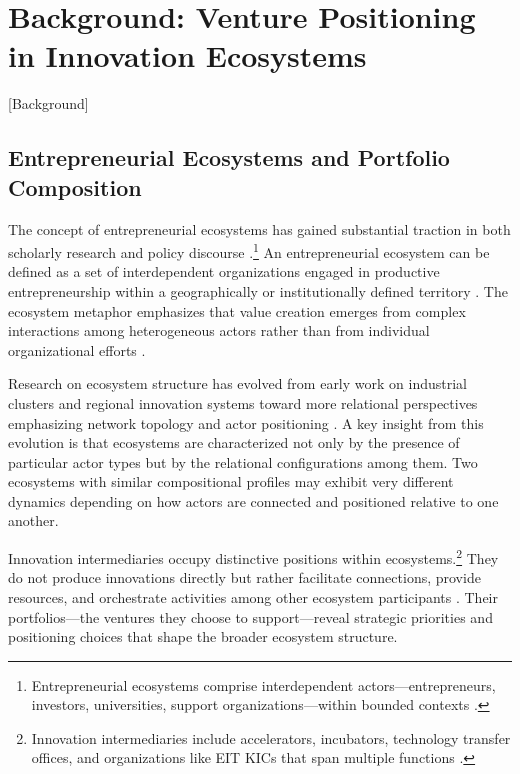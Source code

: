 \documentclass[../main.tex]{subfiles}
\begin{document}
\section{Background: Venture Positioning in Innovation Ecosystems}[Background]

\subsection{Entrepreneurial Ecosystems and Portfolio Composition}

The concept of entrepreneurial ecosystems has gained substantial traction in both scholarly research and policy discourse \cite{isenberg2010big,stam2015entrepreneurial,adner2017ecosystem}.\footnote{Entrepreneurial ecosystems comprise interdependent actors---entrepreneurs, investors, universities, support organizations---within bounded contexts \cite{spigel2017relational}.} An entrepreneurial ecosystem can be defined as a set of interdependent organizations engaged in productive entrepreneurship within a geographically or institutionally defined territory \cite{cohen2006sustainable} \cite{acs2017lineages}. The ecosystem metaphor emphasizes that value creation emerges from complex interactions among heterogeneous actors rather than from individual organizational efforts \cite{adner2017ecosystem}.

Research on ecosystem structure has evolved from early work on industrial clusters \cite{porter1998clusters} and regional innovation systems \cite{cooke2001regional} toward more relational perspectives emphasizing network topology and actor positioning \cite{spigel2017relational}. A key insight from this evolution is that ecosystems are characterized not only by the presence of particular actor types but by the relational configurations among them. Two ecosystems with similar compositional profiles may exhibit very different dynamics depending on how actors are connected and positioned relative to one another.

Innovation intermediaries occupy distinctive positions within ecosystems.\footnote{Innovation intermediaries include accelerators, incubators, technology transfer offices, and organizations like EIT KICs that span multiple functions \cite{howells2006intermediation,kivimaa2019innovation}.} They do not produce innovations directly but rather facilitate connections, provide resources, and orchestrate activities among other ecosystem participants \cite{howells2006intermediation,klerkx2012dealing,vanLente2003roles}. Their portfolios---the ventures they choose to support---reveal strategic priorities and positioning choices that shape the broader ecosystem structure.
\end{document}
